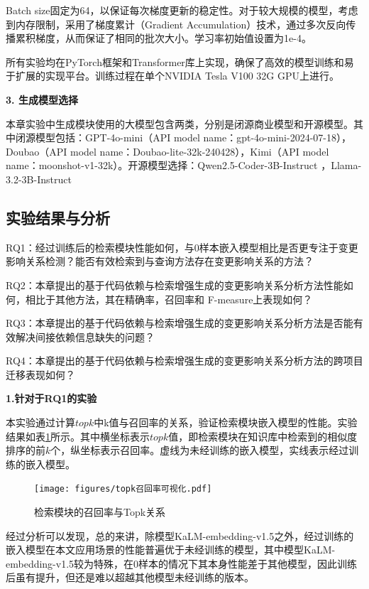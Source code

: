 Batch size固定为64，以保证每次梯度更新的稳定性。对于较大规模的模型，考虑到内存限制，采用了梯度累计（Gradient Accumulation）技术，通过多次反向传播累积梯度，从而保证了相同的批次大小。学习率初始值设置为1e-4。

所有实验均在PyTorch框架和Transformer库上实现，确保了高效的模型训练和易于扩展的实现平台。训练过程在单个NVIDIA Tesla V100 32G GPU上进行。

\noindent \textbf{3. 生成模型选择}
    
本章实验中生成模块使用的大模型包含两类，分别是闭源商业模型和开源模型。其中闭源模型包括：GPT-4o-mini（API model name：gpt-4o-mini-2024-07-18），Doubao（API model name：Doubao-lite-32k-240428），Kimi（API model name：moonshot-v1-32k）。开源模型选择：Qwen2.5-Coder-3B-Instruct ，Llama-3.2-3B-Instruct


\subsection{实验结果与分析}

RQ1：经过训练后的检索模块性能如何，与0样本嵌入模型相比是否更专注于变更影响关系检测？能否有效检索到与查询方法存在变更影响关系的方法？

RQ2：本章提出的基于代码依赖与检索增强生成的变更影响关系分析方法性能如何，相比于其他方法，其在精确率，召回率和 F-measure上表现如何？

RQ3：本章提出的基于代码依赖与检索增强生成的变更影响关系分析方法是否能有效解决间接依赖信息缺失的问题？

RQ4：本章提出的基于代码依赖与检索增强生成的变更影响关系分析方法的跨项目迁移表现如何？
 

\textbf{1.针对于RQ1的实验}

本实验通过计算$topk$中k值与召回率的关系，验证检索模块嵌入模型的性能。实验结果如表\ref{1_检索模块的召回率与Topk的关系可视化}所示。其中横坐标表示$topk$值，即检索模块在知识库中检索到的相似度排序的前$k$个，纵坐标表示召回率。虚线为未经训练的嵌入模型，实线表示经过训练的嵌入模型。

\begin{figure}[htbp]
\centering
\texttt{[image: figures/topk召回率可视化.pdf]}
\caption{检索模块的召回率与Topk关系}
\label{1_检索模块的召回率与Topk的关系可视化}
\end{figure}

经过分析可以发现，总的来讲，除模型KaLM-embedding-v1.5之外，经过训练的嵌入模型在本文应用场景的性能普遍优于未经训练的模型，其中模型KaLM-embedding-v1.5较为特殊，在0样本的情况下其本身性能差于其他模型，因此训练后虽有提升，但还是难以超越其他模型未经训练的版本。

